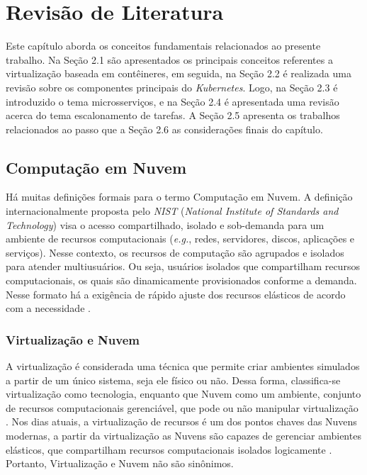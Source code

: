 \chapter{Revisão de Literatura}

Este capítulo aborda os conceitos fundamentais relacionados ao presente trabalho. Na Seção 2.1
são apresentados os principais conceitos referentes a virtualização baseada em contêineres, em seguida, na Seção 2.2 é realizada uma revisão sobre os componentes principais do \textit{Kubernetes}. Logo, na Seção 2.3 é introduzido o tema microsserviços, e na Seção 2.4 é apresentada uma revisão acerca do tema escalonamento de tarefas. A Seção 2.5 apresenta os trabalhos relacionados ao passo que a Seção 2.6 as considerações finais do capítulo.

\section {Computação em Nuvem}
Há muitas definições formais para o termo Computação em Nuvem. A definição internacionalmente proposta pelo \textit{NIST} (\textit{National Institute of Standards and Technology})\cite{mell2011nist} visa o acesso compartilhado, isolado e sob-demanda para um ambiente de recursos computacionais (\textit{e.g.}, redes, servidores, discos, aplicações e serviços). Nesse contexto, os recursos de computação são agrupados e isolados para atender multiusuários. Ou seja, usuários isolados que compartilham recursos computacionais, os quais são dinamicamente provisionados conforme a demanda. Nesse formato há a exigência de rápido ajuste dos recursos elásticos de acordo com a necessidade \cite{Bersten2014}.

\subsection{Virtualização e Nuvem}
A virtualização é considerada uma técnica que permite criar ambientes simulados a partir de um único sistema, seja ele físico ou não. Dessa forma, classifica-se virtualização como tecnologia, enquanto que Nuvem como um ambiente, conjunto de recursos computacionais gerenciável, que pode ou não manipular virtualização \cite{Redhat-virtualization-vs-cloud}. Nos dias atuais, a virtualização de recursos é um dos pontos chaves das Nuvens modernas, a partir da virtualização as Nuvens são capazes de gerenciar ambientes elásticos, que compartilham recursos computacionais isolados logicamente \cite{Zhang2010}. Portanto, Virtualização e Nuvem não são sinônimos.

